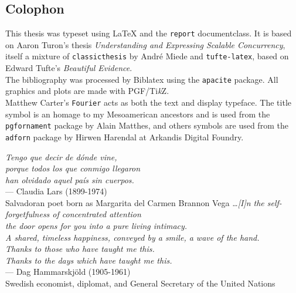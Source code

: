 \begin{titlepage}
\section*{Colophon}

This thesis was typeset using \LaTeX{} and the \texttt{report} documentclass.
It is based on Aaron Turon's thesis \emph{Understanding and Expressing Scalable Concurrency}, itself a mixture of \texttt{classicthesis} by Andr\'e Miede and \texttt{tufte-latex}, based on Edward Tufte's \emph{Beautiful Evidence}.\\[0.5\baselineskip]
The bibliography was processed by Biblatex using the \texttt{apacite} package. 
All graphics and plots are made with PGF/Ti\emph{k}Z.\\[0.5\baselineskip]
Matthew Carter's \texttt{Fourier} acts as both the text and display typeface.
The title symbol is an homage to my Mesoamerican ancestors and is used from the \texttt{pgfornament} package by Alain Matthes, and others symbols are used from the \texttt{adforn} package by Hirwen Harendal at Arkandis Digital Foundry.

\clearpage{}

\thispagestyle{empty}
\vphantom{.}
\vfill
{%
    \flushright{}
    \emph{Tengo que decir de d\'{o}nde vine,\\
porque todos los que conmigo llegaron\\
han olvidado aquel pa\'{i}s sin cuerpos.}\\
    \hfill--- Claudia Lars (1899-1974)\\
    \hfill Salvadoran poet born as Margarita del Carmen Brannon Vega
}
\vfill
{%
    \flushright{}
    \emph{ \dots [I]n the self-forgetfulness of concentrated attention\\
          the door opens for you into a pure living intimacy.\\ A shared, timeless happiness, conveyed by a smile, a wave of the hand.\\
Thanks to those who have taught me this.\\
          Thanks to the days which have taught me this.}\\
    \hfill--- Dag Hammarskj\"{o}ld (1905-1961)\\
    \hfill Swedish economist, diplomat, and General Secretary of the United Nations
}
\vfill

\clearpage{}
\end{titlepage}
